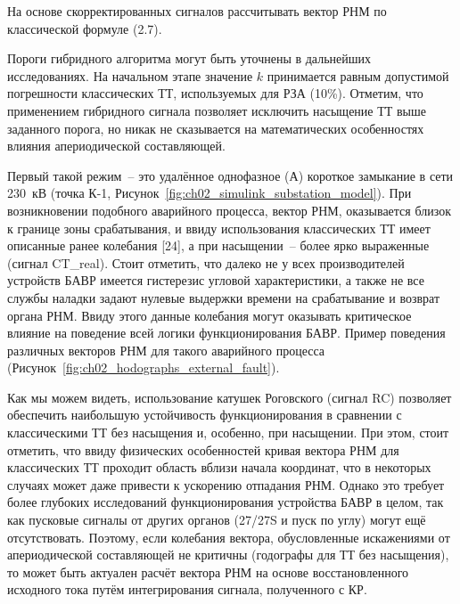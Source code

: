 На основе скорректированных сигналов рассчитывать вектор РНМ по классической формуле (2.7).

Пороги гибридного алгоритма могут быть уточнены в дальнейших исследованиях. На начальном этапе значение $k$ принимается равным допустимой погрешности классических ТТ, используемых для РЗА (10\%). Отметим, что применением гибридного сигнала позволяет исключить насыщение ТТ выше заданного порога, но никак не сказывается на математических особенностях влияния апериодической составляющей.

Первый такой режим~-- это удалённое однофазное (А) короткое замыкание в сети 230~кВ (точка К-1, Рисунок~\ref{fig:ch02_simulink_substation_model}). При возникновении подобного аварийного процесса, вектор РНМ, оказывается близок к границе зоны срабатывания, и ввиду использования классических ТТ имеет описанные ранее колебания [24], а при насыщении~-- более ярко выраженные (сигнал CT\_real). Стоит отметить, что далеко не у всех производителей устройств БАВР имеется гистерезис угловой характеристики, а также не все службы наладки задают нулевые выдержки времени на срабатывание и возврат органа РНМ. Ввиду этого данные колебания могут оказывать критическое влияние на поведение всей логики функционирования БАВР. Пример поведения различных векторов РНМ для такого аварийного процесса (Рисунок~\ref{fig:ch02_hodographs_external_fault}).

Как мы можем видеть, использование катушек Роговского (сигнал RC) позволяет обеспечить наибольшую устойчивость функционирования в сравнении с классическими ТТ без насыщения и, особенно, при насыщении. При этом, стоит отметить, что ввиду физических особенностей кривая вектора РНМ для классических ТТ проходит область вблизи начала координат, что в некоторых случаях может даже привести к ускорению отпадания РНМ. Однако это требует более глубоких исследований функционирования устройства БАВР в целом, так как пусковые сигналы от других органов (27/27S и пуск по углу) могут ещё отсутствовать. Поэтому, если колебания вектора, обусловленные искажениями от апериодической составляющей не критичны (годографы для ТТ без насыщения), то может быть актуален расчёт вектора РНМ на основе восстановленного исходного тока путём интегрирования сигнала, полученного с КР.

